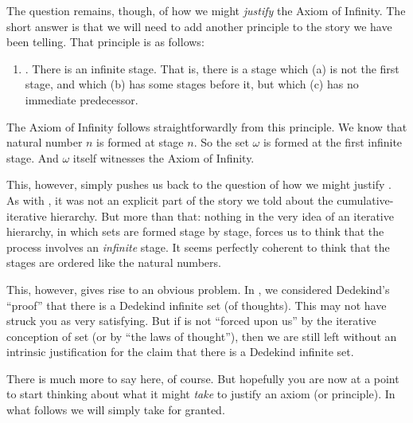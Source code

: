 \documentclass[../../../include/open-logic-section]{subfiles}
\begin{document}
The question remains, though, of how we might \emph{justify} the Axiom
of Infinity. The short answer is that we will need to add another
principle to the story we have been telling. That principle is as
follows:
\begin{enumerate}
	\item[] \stagesinf. There is an infinite stage. That is, there is a stage which (a) is not the first stage, and which (b) has some stages before it, but which (c) has no immediate predecessor.
\end{enumerate}
The Axiom of Infinity follows straightforwardly from this principle.
We know that natural number $n$ is formed at stage $n$. So the set
$\omega$ is formed at the first infinite stage. And $\omega$ itself
witnesses the Axiom of Infinity. 

This, however, simply pushes us back to the question of how we might
justify \stagesinf. As with \stagessucc, it was not an explicit part
of the story we told about the cumulative-iterative hierarchy. But
more than that: nothing in the very idea of an iterative hierarchy, in
which sets are formed stage by stage, forces us to think that the
process involves an \emph{infinite} stage. It seems perfectly coherent
to think that the stages are ordered like the natural numbers. 

This, however, gives rise to an obvious problem. In
, we considered
Dedekind's ``proof'' that there is a Dedekind infinite set (of
thoughts). This may not have struck you as very satisfying. But if
\stagesinf{} is not ``forced upon us'' by the iterative conception of
set (or by ``the laws of thought''), then we are still left without an
intrinsic justification for the claim that there is a Dedekind
infinite set.

There is much more to say here, of course. But hopefully you are now
at a point to start thinking about what it might \emph{take} to
justify an axiom (or principle). In what follows we will simply take
\stagesinf{} for granted.
\end{document}
